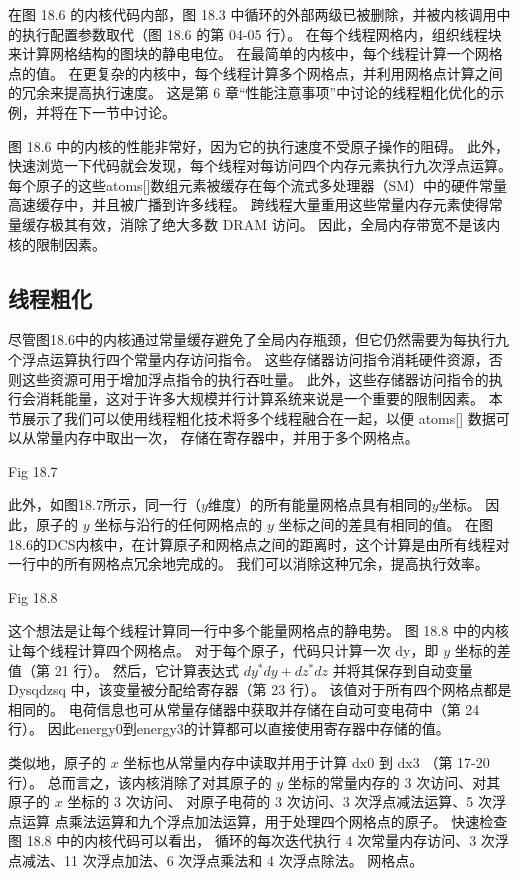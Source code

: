 在图 18.6 的内核代码内部，图 18.3 中循环的外部两级已被删除，并被内核调用中的执行配置参数取代（图 18.6 的第 04-05 行）。 
在每个线程网格内，组织线程块来计算网格结构的图块的静电电位。 在最简单的内核中，每个线程计算一个网格点的值。 
在更复杂的内核中，每个线程计算多个网格点，并利用网格点计算之间的冗余来提高执行速度。 
这是第 6 章“性能注意事项”中讨论的线程粗化优化的示例，并将在下一节中讨论。

图 18.6 中的内核的性能非常好，因为它的执行速度不受原子操作的阻碍。 
此外，快速浏览一下代码就会发现，每个线程对每访问四个内存元素执行九次浮点运算。 
每个原子的这些atoms[]数组元素被缓存在每个流式多处理器（SM）中的硬件常量高速缓存中，并且被广播到许多线程。 
跨线程大量重用这些常量内存元素使得常量缓存极其有效，消除了绝大多数 DRAM 访问。 
因此，全局内存带宽不是该内核的限制因素。

\subsection{线程粗化}
尽管图18.6中的内核通过常量缓存避免了全局内存瓶颈，但它仍然需要为每执行九个浮点运算执行四个常量内存访问指令。 
这些存储器访问指令消耗硬件资源，否则这些资源可用于增加浮点指令的执行吞吐量。 
此外，这些存储器访问指令的执行会消耗能量，这对于许多大规模并行计算系统来说是一个重要的限制因素。 
本节展示了我们可以使用线程粗化技术将多个线程融合在一起，以便 atoms[] 数据可以从常量内存中取出一次，
存储在寄存器中，并用于多个网格点。

{\color{red} Fig 18.7}

此外，如图18.7所示，同一行（$y$维度）的所有能量网格点具有相同的$y$坐标。 
因此，原子的 $y$ 坐标与沿行的任何网格点的 $y$ 坐标之间的差具有相同的值。 
在图18.6的DCS内核中，在计算原子和网格点之间的距离时，这个计算是由所有线程对一行中的所有网格点冗余地完成的。 
我们可以消除这种冗余，提高执行效率。

{\color{red} Fig 18.8}

这个想法是让每个线程计算同一行中多个能量网格点的静电势。 图 18.8 中的内核让每个线程计算四个网格点。 
对于每个原子，代码只计算一次 dy，即 $y$ 坐标的差值（第 21 行）。 
然后，它计算表达式 $d y^{*} d y+d z^{*} d z$ 并将其保存到自动变量 Dysqdzsq 中，该变量被分配给寄存器（第 23 行）。 
该值对于所有四个网格点都是相同的。 电荷信息也可从常量存储器中获取并存储在自动可变电荷中（第 24 行）。 
因此energy0到energy3的计算都可以直接使用寄存器中存储的值。

类似地，原子的 $x$ 坐标也从常量内存中读取并用于计算 $\mathrm{dx} 0$ 到 $\mathrm{dx} 3$ （第 17-20 行）。 
总而言之，该内核消除了对其原子的 $y$ 坐标的常量内存的 3 次访问、对其原子的 $x$ 坐标的 3 次访问、
对原子电荷的 3 次访问、3 次浮点减法运算、5 次浮点运算 点乘法运算和九个浮点加法运算，用于处理四个网格点的原子。 
快速检查图 18.8 中的内核代码可以看出，
循环的每次迭代执行 4 次常量内存访问、3 次浮点减法、11 次浮点加法、6 次浮点乘法和 4 次浮点除法。 网格点。

